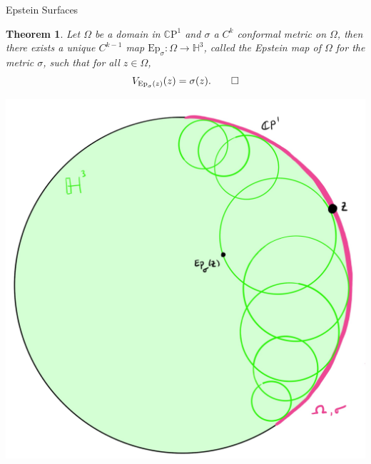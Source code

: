 \documentclass[professionalfont]{beamer}
\newcommand{\CP}{\mathbb{C}\mathrm{P}}
\renewcommand{\H}{\mathbb{H}}
\newtheorem{thm}{Theorem}[section]
\begin{document}
\begin{frame}{Epstein Surfaces}


\begin{thm}
Let $\Omega$ be a domain in $\CP^1$  and $\sigma$ a $C^k$ conformal metric on $\Omega$, then there exists a unique $C^{k-1}$ map $\mathrm{Ep}_\sigma : \Omega \to \H^3$, called the Epstein map of $\Omega$ for the metric $\sigma$, such that for all $z \in \Omega$,
\[
V_{\mathrm{Ep}_\sigma(z)}(z) = \sigma(z). \qed
\]
\end{thm}


\centering\includegraphics[scale=0.06]{Epstein-3.jpg}

\end{frame}


\end{document}
